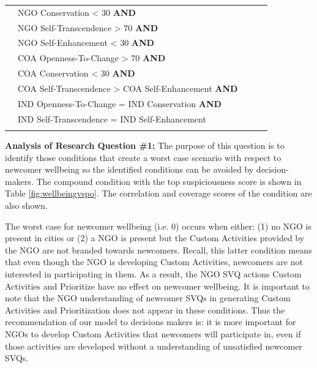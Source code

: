 \documentclass{scspaperproc}
\theoremstyle{scsthe}
\begin{document}
\begin{table}[ht]
\begin{center}
{\begin{tabular}{|l l l l l |}
                                                                      & NGO Conservation < 30 \textbf{AND} & & & \\ 
                                                                      & NGO Self-Transcendence > 70 \textbf{AND} & & & \\ 
                                                                      & NGO Self-Enhancement < 30 \textbf{AND} & & & \\ 
                                                                      & COA Openness-To-Change > 70 \textbf{AND} & & & \\         
                                                                      & COA Conservation < 30 \textbf{AND} & & & \\ 
                                                                      & COA Self-Transcendence > COA Self-Enhancement \textbf{AND} & & & \\ 
                                                                      & IND Openness-To-Change = IND Conservation \textbf{AND} & & & \\         
                                                                      & IND Self-Transcendence =  IND Self-Enhancement& & & \\ 
                                                                       & & & & \\  
\hline
\end{tabular}}
\end{center}
\end{table}
 
{\bf Analysis of Research Question \#1:} The purpose of this question is to identify those conditions that create a worst case scenario with respect to newcomer wellbeing so the identified conditions can be avoided by decision-makers. The compound condition with the top suspiciousness score is shown in Table \ref{fig:wellbeingvspo}. The correlation and coverage scores of the condition are also shown. 

The worst case for newcomer wellbeing (i.e. 0) occurs when either: (1) no NGO is present in cities or (2) a NGO is present but the Custom Activities provided by the NGO are not branded towards newcomers. Recall, this latter condition means that even though the NGO is developing Custom Activities, newcomers are not interested in participating in them. As a result, the NGO SVQ actions Custom Activities and Prioritize have no effect on newcomer wellbeing. It is important to note that the NGO understanding of newcomer SVQs in generating Custom Activities and Prioritization does not appear in these conditions. Thus the recommendation of our model to decisions makers is: it is more important for NGOs to develop Custom Activities that newcomers will participate in, even if those activities are developed without a understanding of unsatisfied newcomer SVQs. 
\end{document}
